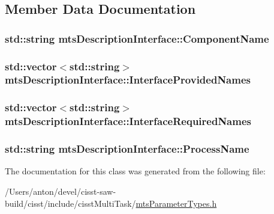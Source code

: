 \subsection{Member Data Documentation}
\hypertarget{classmts_description_interface_a23c0642e38c2a435309fd961f3065a67}{}
\subsubsection[{Component\+Name}]{\setlength{\rightskip}{0pt plus 5cm}std\+::string mts\+Description\+Interface\+::\+Component\+Name}\label{classmts_description_interface_a23c0642e38c2a435309fd961f3065a67}
\hypertarget{classmts_description_interface_ae8e633d272098d0ea2e39406ee453aa3}{}
\subsubsection[{Interface\+Provided\+Names}]{\setlength{\rightskip}{0pt plus 5cm}std\+::vector$<$std\+::string$>$ mts\+Description\+Interface\+::\+Interface\+Provided\+Names}\label{classmts_description_interface_ae8e633d272098d0ea2e39406ee453aa3}
\hypertarget{classmts_description_interface_a7cd4857cf92423bd5f0e481bf394812c}{}
\subsubsection[{Interface\+Required\+Names}]{\setlength{\rightskip}{0pt plus 5cm}std\+::vector$<$std\+::string$>$ mts\+Description\+Interface\+::\+Interface\+Required\+Names}\label{classmts_description_interface_a7cd4857cf92423bd5f0e481bf394812c}
\hypertarget{classmts_description_interface_aa1c020a221d03f7d42beaa0f76133246}{}
\subsubsection[{Process\+Name}]{\setlength{\rightskip}{0pt plus 5cm}std\+::string mts\+Description\+Interface\+::\+Process\+Name}\label{classmts_description_interface_aa1c020a221d03f7d42beaa0f76133246}


The documentation for this class was generated from the following file\+:\begin{DoxyCompactItemize}
\item 
/\+Users/anton/devel/cisst-\/saw-\/build/cisst/include/cisst\+Multi\+Task/\hyperlink{mts_parameter_types_8h}{mts\+Parameter\+Types.\+h}\end{DoxyCompactItemize}
